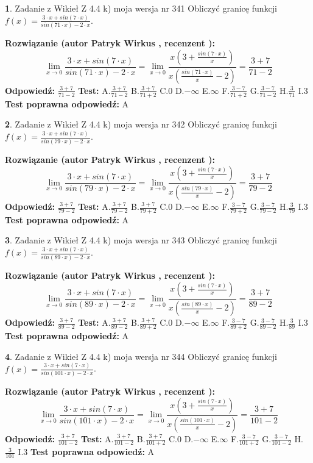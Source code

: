\documentclass[12pt, a4paper]{article}
\theoremstyle{definition} %
\newtheorem{zad}{}
\newcommand{\zadStart}[1]{\begin{zad}#1\newline}
\newcommand{\zadStop}{\end{zad}}
\newcommand{\rozwStart}[2]{\noindent \textbf{Rozwiązanie (autor #1 , recenzent #2): }\newline}
\newcommand{\rozwStop}{\newline}
\newcommand{\odpStart}{\noindent \textbf{Odpowiedź:}\newline}
\newcommand{\odpStop}{\newline}
\newcommand{\testStart}{\noindent \textbf{Test:}\newline}
\newcommand{\testStop}{\newline}
\newcommand{\kluczStart}{\noindent \textbf{Test poprawna odpowiedź:}\newline}
\newcommand{\kluczStop}{\newline}
\begin{document}
\zadStart{Zadanie z Wikieł Z 4.4 k) moja wersja nr 341}
Obliczyć granicę funkcji $f(x)=\frac{3\cdot x +sin(7\cdot x)}{sin(71\cdot x) -2\cdot x}$.
\zadStop
\rozwStart{Patryk Wirkus}{}
$$\lim\limits_{x\to 0}\frac{3\cdot x +sin(7\cdot x)}{sin(71\cdot x) -2\cdot x}
=\lim\limits_{x\to 0}\frac{x(3+\frac{sin(7\cdot x)}{x})}{x(\frac{sin(71\cdot x)}{x}-2)}
=\frac{3+7}{71-2}$$
\rozwStop
\odpStart
$\frac{3+7}{71-2}$
\odpStop
\testStart
A.$\frac{3+7}{71-2}$
B.$\frac{3+7}{71+2}$
C.$0$
D.$-\infty$
E.$\infty$
F.$\frac{3-7}{71+2}$
G.$\frac{3-7}{71-2}$
H.$\frac{3}{71}$
I.$3$
\testStop
\kluczStart
A
\kluczStop



\zadStart{Zadanie z Wikieł Z 4.4 k) moja wersja nr 342}
Obliczyć granicę funkcji $f(x)=\frac{3\cdot x +sin(7\cdot x)}{sin(79\cdot x) -2\cdot x}$.
\zadStop
\rozwStart{Patryk Wirkus}{}
$$\lim\limits_{x\to 0}\frac{3\cdot x +sin(7\cdot x)}{sin(79\cdot x) -2\cdot x}
=\lim\limits_{x\to 0}\frac{x(3+\frac{sin(7\cdot x)}{x})}{x(\frac{sin(79\cdot x)}{x}-2)}
=\frac{3+7}{79-2}$$
\rozwStop
\odpStart
$\frac{3+7}{79-2}$
\odpStop
\testStart
A.$\frac{3+7}{79-2}$
B.$\frac{3+7}{79+2}$
C.$0$
D.$-\infty$
E.$\infty$
F.$\frac{3-7}{79+2}$
G.$\frac{3-7}{79-2}$
H.$\frac{3}{79}$
I.$3$
\testStop
\kluczStart
A
\kluczStop



\zadStart{Zadanie z Wikieł Z 4.4 k) moja wersja nr 343}
Obliczyć granicę funkcji $f(x)=\frac{3\cdot x +sin(7\cdot x)}{sin(89\cdot x) -2\cdot x}$.
\zadStop
\rozwStart{Patryk Wirkus}{}
$$\lim\limits_{x\to 0}\frac{3\cdot x +sin(7\cdot x)}{sin(89\cdot x) -2\cdot x}
=\lim\limits_{x\to 0}\frac{x(3+\frac{sin(7\cdot x)}{x})}{x(\frac{sin(89\cdot x)}{x}-2)}
=\frac{3+7}{89-2}$$
\rozwStop
\odpStart
$\frac{3+7}{89-2}$
\odpStop
\testStart
A.$\frac{3+7}{89-2}$
B.$\frac{3+7}{89+2}$
C.$0$
D.$-\infty$
E.$\infty$
F.$\frac{3-7}{89+2}$
G.$\frac{3-7}{89-2}$
H.$\frac{3}{89}$
I.$3$
\testStop
\kluczStart
A
\kluczStop



\zadStart{Zadanie z Wikieł Z 4.4 k) moja wersja nr 344}
Obliczyć granicę funkcji $f(x)=\frac{3\cdot x +sin(7\cdot x)}{sin(101\cdot x) -2\cdot x}$.
\zadStop
\rozwStart{Patryk Wirkus}{}
$$\lim\limits_{x\to 0}\frac{3\cdot x +sin(7\cdot x)}{sin(101\cdot x) -2\cdot x}
=\lim\limits_{x\to 0}\frac{x(3+\frac{sin(7\cdot x)}{x})}{x(\frac{sin(101\cdot x)}{x}-2)}
=\frac{3+7}{101-2}$$
\rozwStop
\odpStart
$\frac{3+7}{101-2}$
\odpStop
\testStart
A.$\frac{3+7}{101-2}$
B.$\frac{3+7}{101+2}$
C.$0$
D.$-\infty$
E.$\infty$
F.$\frac{3-7}{101+2}$
G.$\frac{3-7}{101-2}$
H.$\frac{3}{101}$
I.$3$
\testStop
\kluczStart
A
\kluczStop
\end{document}
